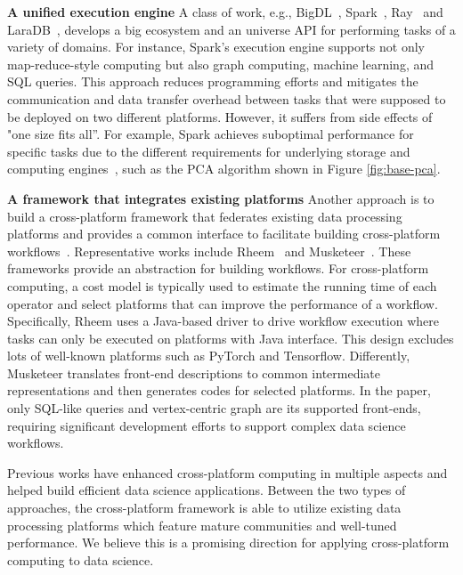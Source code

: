 \textbf{A unified execution engine} A class of work, e.g., BigDL~\cite{dai2019bigdl}, Spark~\cite{zaharia2016apache}, Ray~\cite{moritz2018ray} and LaraDB~\cite{kunft2019intermediate}, develops a big ecosystem and an universe API for performing tasks of a variety of domains. For instance, Spark’s execution engine supports not only map-reduce-style computing but also graph computing, machine learning, and SQL queries. This approach reduces programming efforts and mitigates the communication and data transfer overhead between tasks that were supposed to be deployed on two different platforms. However, it suffers from side effects of "one size fits all”. For example, Spark achieves suboptimal performance for specific tasks due to the different requirements for underlying storage and computing engines~\cite{anderson2017bridging, gittens2016matrix, gittens2018accelerating, dai2019bigdl}, such as the PCA algorithm shown in Figure \ref{fig:base-pca}. %

\textbf{A framework that integrates existing platforms}    Another approach is to build a cross-platform framework that federates existing data processing platforms and provides a common interface to facilitate building cross-platform workflows~\cite{gog2015musketeer, agrawal2016rheem, hausenblas2013apache, beam2017apache, wang2017myria, dziedzic2016data}. Representative works include Rheem~\cite{agrawal2016rheem} and Musketeer~\cite{gog2015musketeer}. 
These frameworks provide an abstraction for building workflows. For cross-platform computing, a cost model is typically used to estimate the running time of each operator and select platforms that can improve the performance of a workflow. 
Specifically, Rheem uses a Java-based driver to drive workflow execution where tasks can only be executed on platforms with Java interface. This design excludes lots of well-known platforms such as PyTorch and Tensorflow. Differently, Musketeer translates front-end descriptions to common intermediate representations and then generates codes for selected platforms. In the paper, only SQL-like queries and vertex-centric graph are its supported front-ends, requiring significant development efforts to support complex data science workflows.

Previous works have enhanced cross-platform computing in multiple aspects and helped build efficient data science applications. Between the two types of approaches, the cross-platform framework is able to utilize existing data processing platforms which feature mature communities and well-tuned performance. We believe this is a promising direction for applying cross-platform computing to data science. 



